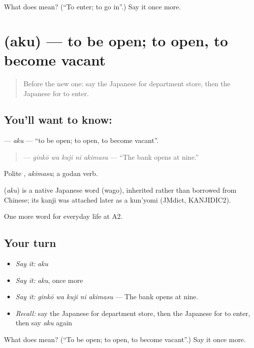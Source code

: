 \begin{tcolorbox}[breakable,colback=teal!4,colframe=teal!35!black,title={Before you move on}]
What does  mean? (\textquotedblleft{}To enter; to go in\textquotedblright{}.) Say it once more.
\end{tcolorbox}
\section[\texorpdfstring{\ja{あく} (aku)}{あく (aku)}]{ (aku) — to be open; to open, to become vacant}

\label{lesson:JA-C190-aku}



\begin{quote}
Before the new one: say the Japanese for department store, then the Japanese for to enter.
\end{quote}

\subsection*{You'll want to know: }
\textbf{} — \emph{aku} — \textquotedblleft{}to be open; to open, to become vacant\textquotedblright{}.

\begin{quote}
\textbf{  } — \emph{ginkō wa kuji ni akimasu} — \textquotedblleft{}The bank opens at nine.\textquotedblright{}
\end{quote}

Polite \textbf{}, \emph{akimasu}; a godan verb.

\begin{cousinweb}
\textbf{} (\emph{aku}) is a native Japanese word (wago), inherited rather than borrowed from Chinese; its kanji was attached later as a kun'yomi (JMdict, KANJIDIC2).
\end{cousinweb}

\begin{grammarlens}[title={What you've built}]
One more word for everyday life at A2.
\end{grammarlens}

\subsection*{Your turn}
\begin{itemize}
\raggedright
  \item \emph{Say it:} \emph{aku}
  \item \emph{Say it:} \emph{aku}, once more
  \item \emph{Say it:} \emph{ginkō wa kuji ni akimasu} — The bank opens at nine.
  \item \emph{Recall:} say the Japanese for department store, then the Japanese for to enter, then say \emph{aku} again
\end{itemize}

\begin{tcolorbox}[breakable,colback=teal!4,colframe=teal!35!black,title={Before you move on}]
What does  mean? (\textquotedblleft{}To be open; to open, to become vacant\textquotedblright{}.) Say it once more.
\end{tcolorbox}

